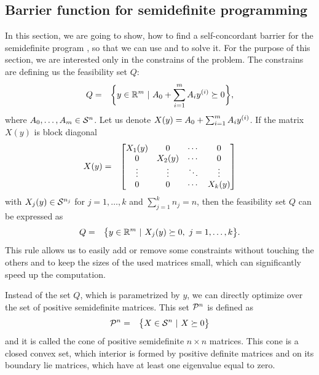 \subsection{Barrier function for semidefinite programming}
In this section, we are going to show, how to find a self-concordant barrier for the semidefinite program , so that we can use  and  to solve it.
For the purpose of this section, we are interested only in the constrains of the problem.
The constrains are defining us the feasibility set $Q$:
\begin{eqnarray}
  Q &=& \bigg\{y\in\mathbb{R}^m\ |\ A_0 + \sum_{i=1}^mA_iy^{(i)} \succeq 0\bigg\},
\end{eqnarray}
where $A_0, \ldots, A_m \in\mathcal{S}^n$.
Let us denote $X(y) = A_0 + \sum_{i=1}^mA_iy^{(i)}$.
If the matrix $X(y)$ is block diagonal
\begin{eqnarray}
  X(y) &=& \begin{bmatrix}
          X_1(y) & 0      & \cdots & 0      \\
          0      & X_2(y) & \cdots & 0      \\
          \vdots & \vdots & \ddots & \vdots \\
          0      & 0      & \cdots & X_k(y)
        \end{bmatrix} \labeleq{SDP:bf:bd}
\end{eqnarray}
with $X_j(y)\in\mathcal{S}^{n_j}$ for $j = 1, \ldots, k$ and $\sum_{j=1}^k n_j = n$, then the feasibility set $Q$ can be expressed as
\begin{eqnarray}
  Q &=& \big\{y\in\mathbb{R}^m\ |\ X_j(y) \succeq 0,\ j = 1,\ldots, k\big\}.
\end{eqnarray}
This rule allows us to easily add or remove some constraints without touching the others and to keep the sizes of the used matrices small, which can significantly speed up the computation.

Instead of the set $Q$, which is parametrized by $y$, we can directly optimize over the set of positive semidefinite matrices. This set $\mathcal{P}^n$ is defined as
\begin{eqnarray}
  \mathcal{P}^n &=& \big\{X\in\mathcal{S}^n\ |\ X\succeq0\big\}
\end{eqnarray}
and it is called the cone of positive semidefinite $n\times n$ matrices. This cone is a closed convex set, which interior is formed by positive definite matrices and on its boundary lie matrices, which have at least one eigenvalue equal to zero.

